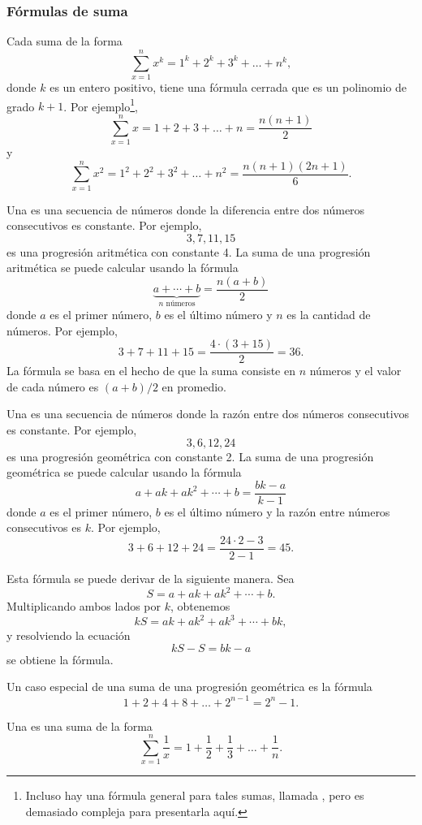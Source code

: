 \subsubsection{F\'ormulas de suma}

Cada suma de la forma
\[\sum_{x=1}^n x^k = 1^k+2^k+3^k+\ldots+n^k,\]
donde $k$ es un entero positivo,
tiene una f\'ormula cerrada que es un
polinomio de grado $k+1$.
Por ejemplo\footnote{
Incluso hay una f\'ormula general para tales sumas, llamada ,
pero es demasiado compleja para presentarla aqu\'i.},
\[\sum_{x=1}^n x = 1+2+3+\ldots+n = \frac{n(n+1)}{2}\]
y
\[\sum_{x=1}^n x^2 = 1^2+2^2+3^2+\ldots+n^2 = \frac{n(n+1)(2n+1)}{6}.\]

Una  es una 
secuencia de n\'umeros
donde la diferencia entre dos n\'umeros consecutivos
es constante.
Por ejemplo,
\[3, 7, 11, 15\]
es una progresi\'on aritm\'etica con constante 4.
La suma de una progresi\'on aritm\'etica se puede calcular
usando la f\'ormula
\[\underbrace{a + \cdots + b}_{n \,\, \textrm{n\'umeros}} = \frac{n(a+b)}{2}\]
donde $a$ es el primer n\'umero,
$b$ es el \'ultimo n\'umero y
$n$ es la cantidad de n\'umeros.
Por ejemplo,
\[3+7+11+15=\frac{4 \cdot (3+15)}{2} = 36.\]
La f\'ormula se basa en el hecho
de que la suma consiste en $n$ n\'umeros y
el valor de cada n\'umero es $(a+b)/2$ en promedio.

Una  es una secuencia
de n\'umeros
donde la raz\'on entre dos n\'umeros consecutivos
es constante.
Por ejemplo,
\[3,6,12,24\]
es una progresi\'on geom\'etrica con constante 2.
La suma de una progresi\'on geom\'etrica se puede calcular
usando la f\'ormula
\[a + ak + ak^2 + \cdots + b = \frac{bk-a}{k-1}\]
donde $a$ es el primer n\'umero,
$b$ es el \'ultimo n\'umero y la
raz\'on entre n\'umeros consecutivos es $k$.
Por ejemplo,
\[3+6+12+24=\frac{24 \cdot 2 - 3}{2-1} = 45.\]

Esta f\'ormula se puede derivar de la siguiente manera. Sea
\[ S = a + ak + ak^2 + \cdots + b .\]
Multiplicando ambos lados por $k$, obtenemos
\[ kS = ak + ak^2 + ak^3 + \cdots + bk,\]
y resolviendo la ecuaci\'on
\[ kS-S = bk-a\]
se obtiene la f\'ormula.

Un caso especial de una suma de una progresi\'on geom\'etrica es la f\'ormula
\[1+2+4+8+\ldots+2^{n-1}=2^n-1.\]


Una  es una suma de la forma
\[ \sum_{x=1}^n \frac{1}{x} = 1+\frac{1}{2}+\frac{1}{3}+\ldots+\frac{1}{n}.\]

